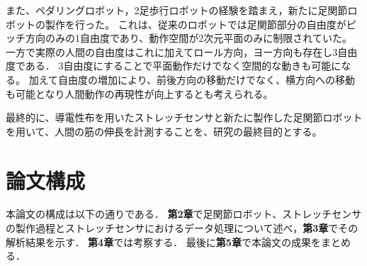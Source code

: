 また、ペダリングロボット，2足歩行ロボットの経験を踏まえ，新たに足関節ロボットの製作を行った。
これは、従来のロボットでは足関節部分の自由度がピッチ方向のみの1自由度であり、動作空間が2次元平面のみに制限されていた。
一方で実際の人間の自由度はこれに加えてロール方向，ヨー方向も存在し3自由度である．
3自由度にすることで平面動作だけでなく空間的な動きも可能になる。
加えて自由度の増加により、前後方向の移動だけでなく、横方向への移動も可能となり人間動作の再現性が向上するとも考えられる。

最終的に、導電性布を用いたストレッチセンサと新たに製作した足関節ロボットを用いて、人間の筋の伸長を計測することを、研究の最終目的とする。

\section{論文構成}
本論文の構成は以下の通りである．
{\bf 第2章}で足関節ロボット、ストレッチセンサの製作過程とストレッチセンサにおけるデータ処理について述べ，{\bf 第3章}でその解析結果を示す．
{\bf 第4章}では考察する． %
最後に{\bf 第5章}で本論文の成果をまとめる．
